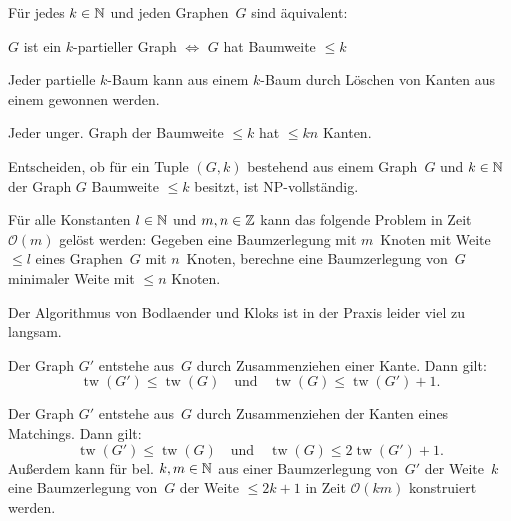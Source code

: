 \documentclass{cheat-sheet}
\renewcommand{\O}{\mathcal{O}} %
\DeclareMathOperator{\treewidth}{tw} %
\begin{document}
\begin{satz}
  Für jedes $k \in \mathbb{N}$ und jeden Graphen~$G$ sind äquivalent:
  \begin{center}
    $G$ ist ein $k$-partieller Graph $\iff$ $G$ hat Baumweite $\leq k$
  \end{center}
\end{satz}

\begin{lem}
  Jeder partielle $k$-Baum kann aus einem $k$-Baum durch Löschen von Kanten aus einem gewonnen werden.
\end{lem}

\begin{lem}
  Jeder unger. Graph der Baumweite $\leq k$ hat $\leq k n$ Kanten.
\end{lem}


\begin{bem}
  Entscheiden, ob für ein Tuple $(G, k)$ bestehend aus einem Graph~$G$ und $k \in \mathbb{N}$ der Graph $G$ Baumweite $\leq k$ besitzt, ist NP-vollständig.
\end{bem}

\begin{lem}
  Für alle Konstanten $l \in \mathbb{N}$ und $m, n \in \mathbb{Z}$ kann das folgende Problem in Zeit~$\O(m)$ gelöst werden:
  Gegeben eine Baumzerlegung mit $m$~Knoten mit Weite $\leq l$ eines Graphen~$G$ mit $n$~Knoten, berechne eine Baumzerlegung von~$G$ minimaler Weite mit $\leq n$ Knoten.
\end{lem}

\begin{bem}
  Der Algorithmus von Bodlaender und Kloks ist in der Praxis leider viel zu langsam.
\end{bem}

\begin{lem}
  Der Graph $G'$ entstehe aus~$G$ durch Zusammenziehen einer Kante.
  Dann gilt:
  \[
    \treewidth(G') \leq \treewidth(G)
    \quad \text{und} \quad
    \treewidth(G) \leq \treewidth(G') + 1.
  \]
\end{lem}

\begin{lem}
  Der Graph $G'$ entstehe aus~$G$ durch Zusammenziehen der Kanten eines Matchings.
  Dann gilt:
  \[
    \treewidth(G') \leq \treewidth(G)
    \quad \text{und} \quad
    \treewidth(G) \leq 2 \treewidth(G') + 1.
  \]
  Außerdem kann für bel. $k, m \in \mathbb{N}$ aus einer Baumzerlegung von~$G'$ der Weite~$k$ eine Baumzerlegung von~$G$ der Weite $\leq 2 k + 1$ in Zeit $\O(k m)$ konstruiert werden.
\end{lem}
\end{document}
